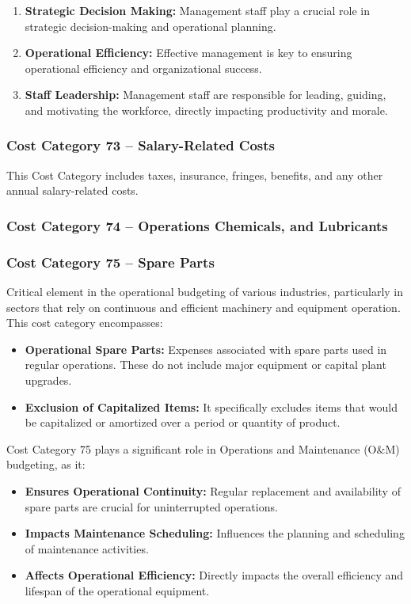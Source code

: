 \begin{enumerate}
    \item \textbf{Strategic Decision Making:} Management staff play a crucial role in strategic decision-making and operational planning.
    \item \textbf{Operational Efficiency:} Effective management is key to ensuring operational efficiency and organizational success.
    \item \textbf{Staff Leadership:} Management staff are responsible for leading, guiding, and motivating the workforce, directly impacting productivity and morale.
\end{enumerate}


\subsubsection*{Cost Category 73 – Salary-Related Costs}
This Cost Category includes taxes, insurance, fringes, benefits, and any other annual salary-related costs.

\subsubsection*{Cost Category 74 – Operations Chemicals, and Lubricants}

\subsubsection*{Cost Category 75 – Spare Parts}
Critical element in the operational budgeting of various industries, particularly in sectors that rely on continuous and efficient machinery and equipment operation.  This cost category encompasses:

\begin{itemize}
    \item \textbf{Operational Spare Parts:} Expenses associated with spare parts used in regular operations. These do not include major equipment or capital plant upgrades.
    \item \textbf{Exclusion of Capitalized Items:} It specifically excludes items that would be capitalized or amortized over a period or quantity of product.
\end{itemize}

Cost Category 75 plays a significant role in Operations and Maintenance (O\&M) budgeting, as it:

\begin{itemize}
    \item \textbf{Ensures Operational Continuity:} Regular replacement and availability of spare parts are crucial for uninterrupted operations.
    \item \textbf{Impacts Maintenance Scheduling:} Influences the planning and scheduling of maintenance activities.
    \item \textbf{Affects Operational Efficiency:} Directly impacts the overall efficiency and lifespan of the operational equipment.
\end{itemize}

